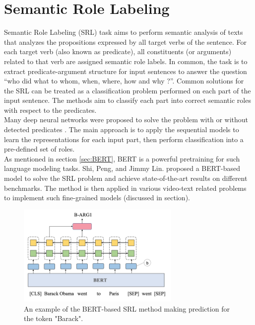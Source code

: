 \section{Semantic Role Labeling}
\label{sec:srl}
Semantic Role Labeling (SRL) task aims to perform semantic analysis of texts that analyzes the propositions expressed by all target verbs of the sentence. 
For each target verb (also known as predicate), all constituents (or arguments) related to that verb are assigned semantic role labels. In common, the task is to extract predicate-argument structure for input sentences to answer the question “who did what to whom, when, where, how and why ?”.
Common solutions for the SRL can be treated as a classification problem performed on each part of the input sentence. 
The methods  aim to classify each part into correct semantic roles with respect to the predicates. \\
Many deep neural networks were proposed to solve the problem with or without detected predicates \cite{zhou2015end, marcheggiani2017simple, he2017deep, tan2018deep, he2018jointly, strubell2018linguistically}. 
The main approach is to apply the sequential models to learn the representations for each input part, then perform classification into a pre-defined set of roles.\\ 
As mentioned in section \ref{sec:BERT}, BERT is a powerful pretraining for such language modeling tasks. Shi, Peng, and Jimmy Lin.\cite{shi2019simple} proposed a BERT-based model to solve the SRL problem and achieve state-of-the-art results on different benchmarks. The method is then applied in various video-text related problems to implement such fine-grained models (discussed in section). 
\begin{figure}[t!]
    \centering
    \includegraphics[width=0.7\textwidth]{images/SRL_overview.png}
    \caption{An example of the BERT-based SRL method \cite{shi2019simple} making prediction for the token "Barack".}
    \label{fig:srl_overview}
\end{figure}
